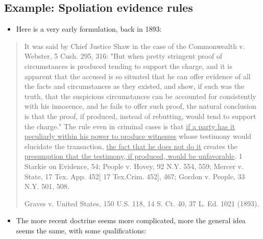 \documentclass[
  10pt,
  dvipsnames,enabledeprecatedfontcommands]{scrartcl}
\providecommand{\tightlist}{%
  \setlength{\itemsep}{0pt}\setlength{\parskip}{0pt}}
\begin{document}
\hypertarget{example-spoliation-evidence-rules}{%
\subsection{Example: Spoliation evidence
rules}\label{example-spoliation-evidence-rules}}

\begin{itemize}
\tightlist
\item
  Here is a very early formulation, back in 1893:
\end{itemize}

\begin{quote}
It was said by Chief Justice Shaw in the case of the Commonwealth v. Webster, 5 Cush. 295, 316: "But when pretty stringent proof of circumstances is produced tending to support the charge, and it is apparent that the accused is so situated that he can offer evidence of all the facts and circumstances as they existed, and show, if such was the truth, that the suspicious circumstances  can be accounted for consistently with his innocence, and he fails to offer such proof, the natural conclusion is that the proof, if produced, instead of rebutting, would tend to support the charge." The rule even in criminal cases is that \underline{if a party has it peculiarly within his power to produce witnesses} whose testimony would elucidate the transaction, \underline{the fact that he does not do it} creates the \underline{presumption that the testimony, if produced, would be unfavorable}. 1 Starkie on Evidence, 54; People v. Hovey, 92 N.Y. 554, 559; Mercer v. State, 17 Tex. App. 452[ 17 Tex.Crim. 452], 467; Gordon v. People, 33 N.Y. 501, 508.

Graves v. United States, 150 U.S. 118, 14 S. Ct. 40, 37 L. Ed. 1021 (1893).
\end{quote}


\begin{itemize}
\tightlist
\item
  The more recent doctrine seems more complicated, more the general idea
  seems the same, with some qualifications:
\end{itemize}
\end{document}
